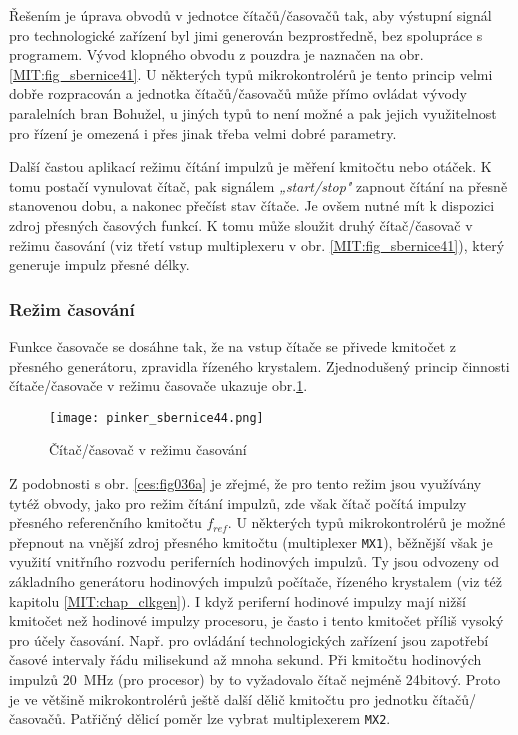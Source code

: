         Řešením je úprava obvodů v jednotce čítačů/časovačů tak, aby výstupní signál pro 
        technologické zařízení byl jimi generován bezprostředně, bez spolupráce s programem. Vývod 
        klopného obvodu z pouzdra je naznačen na obr. \ref{MIT:fig_sbernice41}. U některých typů 
        mikrokontrolérů je tento princip velmi dobře rozpracován a jednotka čítačů/časovačů může 
        přímo ovládat vývody paralelních bran Bohužel, u jiných typů to není možné a pak jejich 
        využitelnost pro řízení je omezená i přes jinak třeba velmi dobré parametry.
        
        Další častou aplikací režimu čítání impulzů je měření kmitočtu nebo otáček. K tomu postačí 
        vynulovat čítač, pak signálem \emph{„start/stop"} zapnout čítání na přesně stanovenou dobu, 
        a nakonec přečíst stav čítače. Je ovšem nutné mít k dispozici zdroj přesných časových 
        funkcí. K tomu může sloužit druhý čítač/časovač v režimu časování (viz třetí vstup 
        multiplexeru v obr. \ref{MIT:fig_sbernice41}), který generuje impulz přesné délky.
        
      \subsubsection{Režim časování}
        Funkce časovače se dosáhne tak, že na vstup čítače se přivede kmitočet z přesného 
        generátoru, zpravidla řízeného krystalem. Zjednodušený princip činnosti čítače/časovače v 
        režimu časovače ukazuje obr.\ref{MIT:fig_sbernice44}.
        
        \begin{figure}[ht!] %
          \centering
          \texttt{[image: pinker\_sbernice44.png]}
          \caption{Čítač/časovač v režimu časování}
          \label{MIT:fig_sbernice44}
        \end{figure}
        
        Z podobnosti s obr. \ref{ces:fig036a} je zřejmé, že pro tento režim jsou využívány 
        tytéž obvody, jako pro režim čítání impulzů, zde však čítač počítá impulzy přesného 
        referenčního kmitočtu \(f_{ref}\). U některých typů mikrokontrolérů je možné přepnout na 
        vnější zdroj přesného kmitočtu (multiplexer \texttt{MX1}), běžnější však je využití 
        vnitřního rozvodu periferních hodinových impulzů. Ty jsou odvozeny od základního generátoru 
        hodinových impulzů počítače, řízeného krystalem (viz též kapitolu \ref{MIT:chap_clkgen}). I 
        když periferní hodinové impulzy mají nižší kmitočet než hodinové impulzy procesoru, je 
        často i tento kmitočet příliš vysoký pro účely časování. Např. pro ovládání technologických 
        zařízení jsou zapotřebí časové intervaly řádu milisekund až mnoha sekund. Při kmitočtu 
        hodinových impulzů \SI{20}{\mega\hertz} (pro procesor) by to vyžadovalo čítač nejméně 
        24bitový. Proto je ve většině mikrokontrolérů ještě další dělič kmitočtu pro jednotku 
        čítačů/časovačů. Patřičný dělicí poměr lze vybrat multiplexerem \texttt{MX2}.
        
